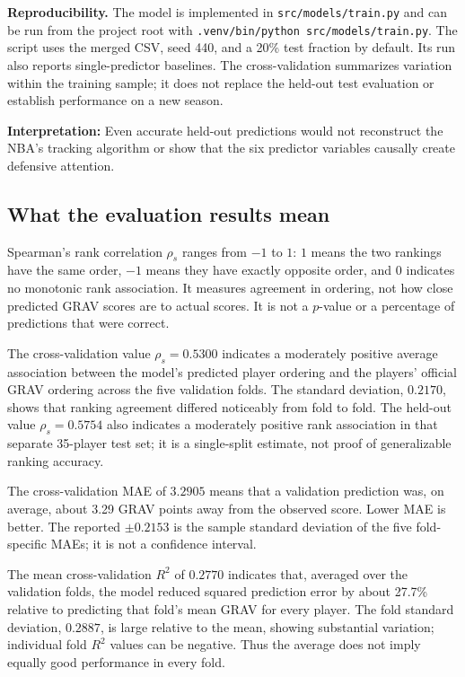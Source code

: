 \documentclass[11pt]{article}
\begin{document}
\textbf{Reproducibility.} The model is implemented in
\texttt{src/models/train.py} and can be run from the project root with
\texttt{.venv/bin/python src/models/train.py}. The script uses the merged
CSV, seed 440, and a 20\% test fraction by default. Its run also reports
single-predictor baselines. The cross-validation summarizes variation
within the training sample; it does not replace the held-out test
evaluation or establish performance on a new season.

\textbf{Interpretation:} Even accurate held-out predictions would not
reconstruct the NBA's tracking algorithm or show that the six predictor
variables causally create defensive attention.

\subsection{What the evaluation results mean}
Spearman's rank correlation $\rho_s$ ranges from $-1$ to $1$: $1$ means
the two rankings have the same order, $-1$ means they have exactly
opposite order, and $0$ indicates no monotonic rank association. It
measures agreement in ordering, not how close predicted GRAV scores are
to actual scores. It is not a $p$-value or a percentage of predictions
that were correct.

The cross-validation value $\rho_s=0.5300$ indicates a moderately positive
average association between the model's predicted player ordering and the
players' official GRAV ordering across the five validation folds. The
standard deviation, $0.2170$, shows that ranking agreement differed
noticeably from fold to fold. The held-out value $\rho_s=0.5754$ also
indicates a moderately positive rank association in that separate
35-player test set; it is a single-split estimate, not proof of
generalizable ranking accuracy.

The cross-validation MAE of $3.2905$ means that a validation prediction
was, on average, about 3.29 GRAV points away from the observed score.
Lower MAE is better. The reported $\pm0.2153$ is the sample standard
deviation of the five fold-specific MAEs; it is not a confidence interval.

The mean cross-validation $R^2$ of $0.2770$ indicates that, averaged over
the validation folds, the model reduced squared prediction error by about
27.7\% relative to predicting that fold's mean GRAV for every player.
The fold standard deviation, $0.2887$, is large relative to the mean,
showing substantial variation; individual fold $R^2$ values can be
negative. Thus the average does not imply equally good performance in
every fold.
\end{document}
